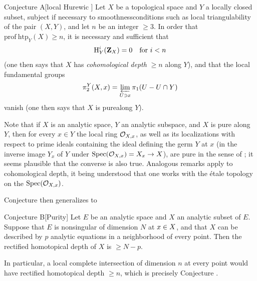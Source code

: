  \label{XIII.6.A}
\begin{enonce*}{Conjecture A}[\og local Hurewic \fg\ndemark]
Let $X$ be a topological space and $Y$ a locally closed subset, subject if necessary to \og smoothness\fg conditions such as local triangulability of the pair $(X,Y)$, and let $n$ be an integer $\geq 3$. In order that $\mathrm{prof\:htp}_Y(X)\geq n$, it is necessary and sufficient that\pageoriginale
$$
\H^i_Y(\ZZ_X)=0\quad\text{for }i<n
$$
(one then says that $X$ has \emph{cohomological depth} $\geq n$ along $Y$), and that the local fundamental groups
$$
\sisi{\pi^2_Y}{\pi_2^Y}(X,x)=\varprojlim_{U\ni x}\pi_1(U-U\cap Y)
$$
vanish (one then says that $X$ is \og pure\fg along $Y$).
\end{enonce*}

Note that if $X$ is an analytic space, $Y$ an analytic subspace, and $X$ is pure along $Y$, then for every $x\in Y$ the local ring $\OXx$, as well as its localizations with respect to prime ideals containing the ideal defining the germ $Y$ at $x$ (\ie in the inverse image $Y_x$ of $Y$ under $\Spec(\OXx)=X_x\to X$), are pure in the sense of \Exp {}; it seems plausible that the converse is also true. Analogous remarks apply to cohomological depth, it being understood that one works with the \'etale topology on the $\Spec(\OXx)$.

Conjecture  then generalizes to

 \label{XIII.6.B}
\begin{enonce*}{Conjecture B}[\og Purity\fg\ndemark]
Let $E$ be an analytic space and $X$ an analytic subset of $E$. Suppose that $E$ is nonsingular of dimension $N$ at $x\sisi{}{\in X}$, and that $X$ can be described by $p$ analytic equations in a neighborhood of every point. Then the rectified homotopical depth of $X$ is $\geq N-p$.
\end{enonce*}

In particular, a local complete intersection of dimension $n$ at every point would have rectified homotopical depth $\geq n$, which is precisely Conjecture .

